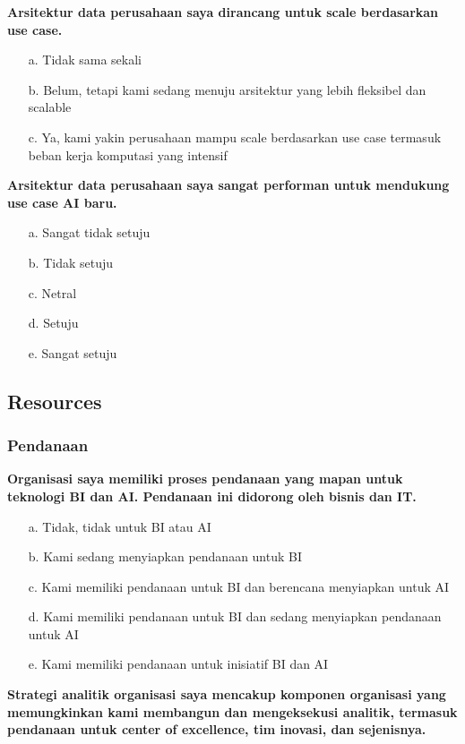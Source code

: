 \documentclass{article}
\begin{document}
\textbf{Arsitektur data perusahaan saya dirancang untuk scale berdasarkan use case.}

\begin{enumerate}
	\item[a.] Tidak sama sekali
	\item[b.] Belum, tetapi kami sedang menuju arsitektur yang lebih fleksibel dan scalable
	\item[c.] Ya, kami yakin perusahaan mampu scale berdasarkan use case termasuk beban kerja komputasi yang intensif
\end{enumerate}

\textbf{Arsitektur data perusahaan saya sangat performan untuk mendukung use case AI baru.}

\begin{enumerate}
	\item[a.] Sangat tidak setuju
	\item[b.] Tidak setuju
	\item[c.] Netral
	\item[d.] Setuju
	\item[e.] Sangat setuju
\end{enumerate}

\subsection{Resources}

\subsubsection{Pendanaan}

\textbf{Organisasi saya memiliki proses pendanaan yang mapan untuk teknologi BI dan AI. Pendanaan ini didorong oleh bisnis dan IT.}

\begin{enumerate}
	\item[a.] Tidak, tidak untuk BI atau AI
	\item[b.] Kami sedang menyiapkan pendanaan untuk BI
	\item[c.] Kami memiliki pendanaan untuk BI dan berencana menyiapkan untuk AI
	\item[d.] Kami memiliki pendanaan untuk BI dan sedang menyiapkan pendanaan untuk AI
	\item[e.] Kami memiliki pendanaan untuk inisiatif BI dan AI
\end{enumerate}

\textbf{Strategi analitik organisasi saya mencakup komponen organisasi yang memungkinkan kami membangun dan mengeksekusi analitik, termasuk pendanaan untuk center of excellence, tim inovasi, dan sejenisnya.}
\end{document}
